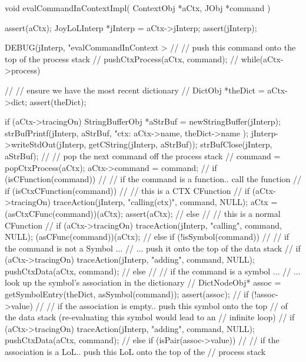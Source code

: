 \startCCode
void evalCommandInContextImpl(
  ContextObj *aCtx,
  JObj   *command
) {
  assert(aCtx);
  JoyLoLInterp *jInterp = aCtx->jInterp;
  assert(jInterp);

  DEBUG(jInterp, "evalCommandInContext > %
  //
  // push this command onto the top of the process stack
  //
  pushCtxProcess(aCtx, command);
  //
  while(aCtx->process) {
    //
    // ensure we have the most recent dictionary
    //
    DictObj *theDict = aCtx->dict;
    assert(theDict);
    
    if (aCtx->tracingOn) {
      StringBufferObj *aStrBuf = 
        newStringBuffer(jInterp);
      strBufPrintf(jInterp, aStrBuf,
        "\n ctx: %
        aCtx->name, theDict->name
      );
      jInterp->writeStdOut(jInterp, getCString(jInterp, aStrBuf));
      strBufClose(jInterp, aStrBuf);
    }
    //
    // pop the next command off the process stack
    //
    command = popCtxProcess(aCtx);
    aCtx->command = command;
    //
    if (isCFunction(command)) {
      //
      // if the command is a function.. call the function
      //
      if (isCtxCFunction(command)) {
        //
        // this is a CTX CFunction
        //
        if (aCtx->tracingOn) 
          traceAction(jInterp, "calling(ctx)", command, NULL);
        aCtx = (asCtxCFunc(command))(aCtx);
        assert(aCtx);
        //
      } else {
        //
        // this is a normal CFunction
        //
        if (aCtx->tracingOn) 
          traceAction(jInterp, "calling", command, NULL);
        (asCFunc(command))(aCtx);
        //
      }
    } else if (!isSymbol(command)) {
      //
      // if the command is not a Symbol ...
      //  ...  push it onto the top of the data stack
      //
      if (aCtx->tracingOn)
        traceAction(jInterp, "adding", command, NULL);
      pushCtxData(aCtx, command);
      //
    } else {
      //
      // if the command is a symbol ...
      //  ... look up the symbol's association in the dictionary
      //
      DictNodeObj* assoc = getSymbolEntry(theDict, asSymbol(command));
      assert(assoc);
      //
      if (!assoc->value) {
        //
        // if the association is empty.. push this symbol onto the top
        // of the data stack (re-evaluating this symbol would lead to an
        // infinite loop)
        //
        if (aCtx->tracingOn)
          traceAction(jInterp, "adding", command, NULL);
        pushCtxData(aCtx, command);
        //
      } else if (isPair(assoc->value)) {
        //
        // if the association is a LoL.. push this LoL onto the top of the
        // process stack
}}}}
